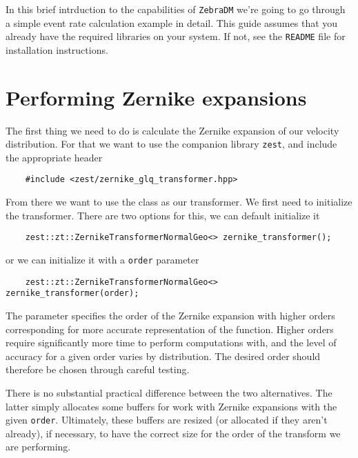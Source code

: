 \documentclass{article}
\begin{document}
In this brief intrduction to the capabilities of \texttt{ZebraDM} we're going to go through a simple event rate calculation example in detail. This guide assumes that you already have the required libraries on your system. If not, see the \texttt{README} file for installation instructions.

\section{Performing Zernike expansions}

The first thing we need to do is calculate the Zernike expansion of our velocity distribution. For that we want to use the companion library \texttt{zest}, and include the appropriate header
\begin{verbatim}
    #include <zest/zernike_glq_transformer.hpp>
\end{verbatim}
From there we want to use the class  as our transformer. We first need to initialize the transformer. There are two options for this, we can default initialize it
\begin{verbatim}
    zest::zt::ZernikeTransformerNormalGeo<> zernike_transformer();
\end{verbatim}
or we can initialize it with a \texttt{order} parameter
\begin{verbatim}
    zest::zt::ZernikeTransformerNormalGeo<> zernike_transformer(order);
\end{verbatim}
The parameter  specifies the order of the Zernike expansion with higher orders corresponding for more accurate representation of the function. Higher orders require significantly more time to perform computations with, and the level of accuracy for a given order varies by distribution. The desired order should therefore be chosen through careful testing.

There is no substantial practical difference between the two alternatives. The latter simply allocates some buffers for work with Zernike expansions with the given \texttt{order}. Ultimately, these buffers are resized (or allocated if they aren't already), if necessary, to have the correct size for the order of the transform we are performing.
\end{document}
